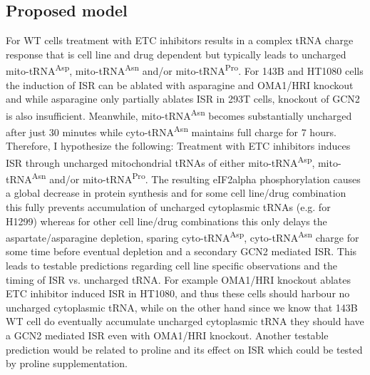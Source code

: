 \subsection{Proposed model}
For WT cells treatment with ETC inhibitors results in a complex tRNA charge response that is cell line and drug dependent but typically leads to uncharged mito-tRNA\textsuperscript{Asp}, mito-tRNA\textsuperscript{Asn} and/or mito-tRNA\textsuperscript{Pro}.
For 143B and HT1080 cells the induction of ISR can be ablated with asparagine and OMA1/HRI knockout and while asparagine only partially ablates ISR in 293T cells, knockout of GCN2 is also insufficient.
Meanwhile, mito-tRNA\textsuperscript{Asn} becomes substantially uncharged after just 30 minutes while cyto-tRNA\textsuperscript{Asn} maintains full charge for 7 hours.
Therefore, I hypothesize the following:
Treatment with ETC inhibitors induces ISR through uncharged mitochondrial tRNAs of either mito-tRNA\textsuperscript{Asp}, mito-tRNA\textsuperscript{Asn} and/or mito-tRNA\textsuperscript{Pro}.
The resulting eIF2alpha phosphorylation causes a global decrease in protein synthesis and for some cell line/drug combination this fully prevents accumulation of uncharged cytoplasmic tRNAs (e.g. for H1299) whereas for other cell line/drug combinations this only delays the aspartate/asparagine depletion, sparing cyto-tRNA\textsuperscript{Asp}, cyto-tRNA\textsuperscript{Asn} charge for some time before eventual depletion and a secondary GCN2 mediated ISR.
This leads to testable predictions regarding cell line specific observations and the timing of ISR vs. uncharged tRNA.
For example OMA1/HRI knockout ablates ETC inhibitor induced ISR in HT1080, and thus these cells should harbour no uncharged cytoplasmic tRNA, while on the other hand since we know that 143B WT cell do eventually accumulate uncharged cytoplasmic tRNA they should have a GCN2 mediated ISR even with OMA1/HRI knockout.
Another testable prediction would be related to proline and its effect on ISR which could be tested by proline supplementation.

